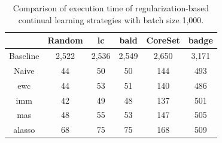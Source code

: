 \begin{table}[h]
    \centering
    \begin{tabular}{c | c c c c c } 
         & Random & \gls{lc} & \gls{bald} & CoreSet & \gls{badge}\\ 
        \hline 
        Baseline & 2,522 & 2,536 & 2,549 & 2,650 & 3,171 \\
        \hline
        Naive & 44 & 50 & 50 & 144 & 493 \\
        \gls{ewc} & 44 & 53 & 51 & 140 & 486\\
        \gls{imm} & 42 & 49 & 48 & 137 & 501\\
        \gls{mas} & 48 & 55 & 53 & 147 & 505\\
        \gls{alasso} & 68 & 75 & 75 & 168 & 509\\
    \end{tabular}
    \caption{Comparison of execution time of regularization-based continual learning strategies
    with batch size 1,000.}
    \label{fig:Appendix:CAL:1000bTimeTable}
\end{table}


